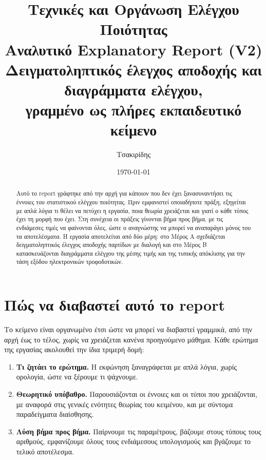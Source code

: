\documentclass[12pt,a4paper]{article}
\title{
    \textbf{Τεχνικές και Οργάνωση Ελέγχου Ποιότητας}\\[0.25cm]
    \Large Αναλυτικό Explanatory Report (V2)\\[0.15cm]
    \large Δειγματοληπτικός έλεγχος αποδοχής και διαγράμματα ελέγχου,\\
    γραμμένο ως πλήρες εκπαιδευτικό κείμενο
}
\author{Τσακιρίδης}
\date{\today}
\begin{document}
\maketitle
\thispagestyle{fancy}

\begin{abstract}
Αυτό το report γράφτηκε από την αρχή για κάποιον που δεν έχει ξανασυναντήσει
τις έννοιες του στατιστικού ελέγχου ποιότητας. Πριν εμφανιστεί οποιαδήποτε
πράξη, εξηγείται με απλά λόγια τι θέλει να πετύχει η εργασία, ποια θεωρία
χρειάζεται και γιατί ο κάθε τύπος έχει τη μορφή που έχει. Στη συνέχεια οι
πράξεις γίνονται βήμα προς βήμα, με τις ενδιάμεσες τιμές να φαίνονται όλες,
ώστε ο αναγνώστης να μπορεί να αναπαράγει μόνος του τα αποτελέσματα. Η
εργασία αποτελείται από δύο μέρη: στο Μέρος Α σχεδιάζεται δειγματοληπτικός
έλεγχος αποδοχής παρτίδων με διαλογή και στο Μέρος Β κατασκευάζονται
διαγράμματα ελέγχου της μέσης τιμής και της τυπικής απόκλισης για την τάση
εξόδου ηλεκτρονικών τροφοδοτικών.
\end{abstract}

\tableofcontents
\newpage

\section*{Πώς να διαβαστεί αυτό το report}

Το κείμενο είναι οργανωμένο έτσι ώστε να μπορεί να διαβαστεί γραμμικά, από
την αρχή έως το τέλος, χωρίς να χρειάζεται κανένα προηγούμενο μάθημα. Κάθε
ερώτημα της εργασίας ακολουθεί την ίδια τριμερή δομή:

\begin{enumerate}[leftmargin=2.2em]
    \item \textbf{Τι ζητάει το ερώτημα.} Η εκφώνηση ξαναγράφεται με απλά λόγια,
    χωρίς ορολογία, ώστε να ξέρουμε τι ψάχνουμε.
    \item \textbf{Θεωρητικό υπόβαθρο.} Παρουσιάζονται οι έννοιες και οι τύποι
    που χρειάζονται, με αναφορά στις γενικές ενότητες θεωρίας του κειμένου,
    και με σύντομα παραδείγματα διαίσθησης.
    \item \textbf{Λύση βήμα προς βήμα.} Παίρνουμε τις παραμέτρους, βάζουμε στους
    τύπους τους αριθμούς, εμφανίζουμε όλους τους ενδιάμεσους υπολογισμούς και
    βγάζουμε το τελικό αποτέλεσμα.
\end{enumerate}
\end{document}
